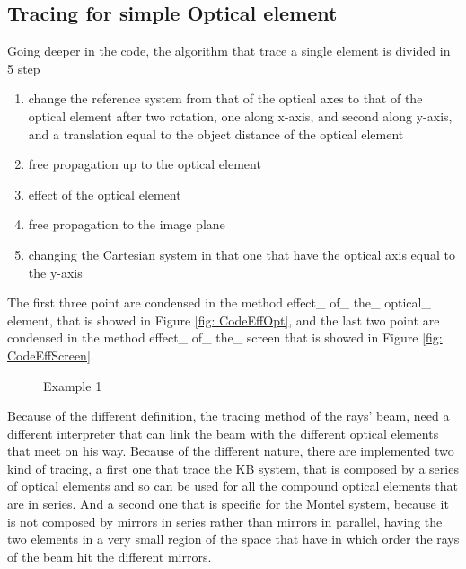 \subsection{Tracing for simple Optical element}
Going deeper in the code, the algorithm that trace a single element is divided in 5 step
\begin{enumerate}
	\item change the reference system from that of the optical axes to that of the optical element after two rotation, one along x-axis, and second along y-axis, and a translation equal to the object distance of the optical element
	\item free propagation up to the optical element
	\item effect of the optical element
	\item free propagation to the image plane
	\item changing the Cartesian system in that one that have the optical axis equal to the y-axis
\end{enumerate}
The first three point are condensed in the method effect\_ of\_ the\_ optical\_ element, that is showed in Figure \ref{fig: CodeEffOpt}, and the last two point are condensed in the method effect\_ of\_ the\_ screen that is showed in Figure \ref{fig: CodeEffScreen}.
\begin{figure}[H]
%
\centering
%
\quad
%
%
\caption{Example 1}
\label{fig :p1}
%
\end{figure}
Because of the different definition, the tracing method of the rays' beam, need a different interpreter that can link the beam with the different optical elements that meet on his way. Because of the different nature, there are implemented two kind of tracing, a first one that trace the KB system, that is composed by a series of optical elements and so can be used for all the compound optical elements that are in series. And a second one that is specific for the Montel system, because it is not composed by mirrors in series rather than mirrors in parallel, having the two elements in a very small region of the space that have in which order the rays of the beam hit the different mirrors.
